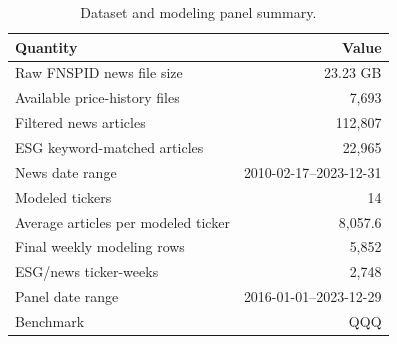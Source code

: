 \begin{table}[t]
  \caption{Dataset and modeling panel summary.}
  \label{tab:dataset-summary}
  \centering
  \small
  \setlength{\tabcolsep}{3pt}
  \begin{tabular}{@{}p{}r@{}}
    \toprule
    Quantity & Value \\
    \midrule
    Raw FNSPID news file size & 23.23 GB \\
    Available price-history files & 7,693 \\
    Filtered news articles & 112,807 \\
    ESG keyword-matched articles & 22,965 \\
    News date range & 2010-02-17--2023-12-31 \\
    Modeled tickers & 14 \\
    Average articles per modeled ticker & 8,057.6 \\
    Final weekly modeling rows & 5,852 \\
    ESG/news ticker-weeks & 2,748 \\
    Panel date range & 2016-01-01--2023-12-29 \\
    Benchmark & QQQ \\
    \bottomrule
  \end{tabular}
\end{table}
